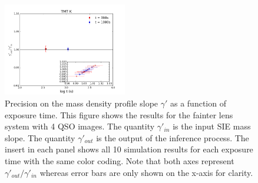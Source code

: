 \documentclass[a4paper,11pt]{article}
\begin{document}
\begin{figure}
\begin{center}
\includegraphics[width=0.48\textwidth]{figures/gamma_135949_4QSOimages_TMT.png}
\end{center}
\caption{Precision on the mass density profile slope $\gamma'$ as a function of exposure time.  This figure shows the results for the fainter lens system with 4 QSO images. The quantity $\gamma'_{in}$ is the input SIE mass slope. The quantity $\gamma'_{out}$ is the output of the inference process.
The insert in each panel shows all 10 simulation results for each exposure time with the same color coding. Note that both axes represent $\gamma'_{out}/\gamma'_{in}$ whereas error bars are only shown on the x-axis for clarity.}
\label{fig:gamma_fainter_4QSOimages}
\end{figure}
\end{document}
